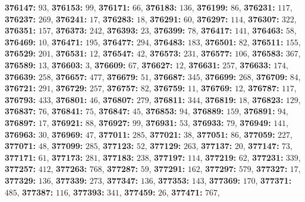 \textsf{\bfseries 376147:} $93$, \textsf{\bfseries 376153:} $99$, \textsf{\bfseries 376171:} $66$, \textsf{\bfseries 376183:} $136$, \textsf{\bfseries 376199:} $86$, \textsf{\bfseries 376231:} $117$, \textsf{\bfseries 376237:} $269$, \textsf{\bfseries 376241:} $17$, \textsf{\bfseries 376283:} $18$, \textsf{\bfseries 376291:} $60$, \textsf{\bfseries 376297:} $114$, \textsf{\bfseries 376307:} $322$, \textsf{\bfseries 376351:} $157$, \textsf{\bfseries 376373:} $242$, \textsf{\bfseries 376393:} $23$, \textsf{\bfseries 376399:} $78$, \textsf{\bfseries 376417:} $141$, \textsf{\bfseries 376463:} $58$, \textsf{\bfseries 376469:} $10$, \textsf{\bfseries 376471:} $195$, \textsf{\bfseries 376477:} $294$, \textsf{\bfseries 376483:} $183$, \textsf{\bfseries 376501:} $82$, \textsf{\bfseries 376511:} $155$, \textsf{\bfseries 376529:} $201$, \textsf{\bfseries 376531:} $12$, \textsf{\bfseries 376547:} $42$, \textsf{\bfseries 376573:} $231$, \textsf{\bfseries 376577:} $106$, \textsf{\bfseries 376583:} $367$, \textsf{\bfseries 376589:} $13$, \textsf{\bfseries 376603:} $3$, \textsf{\bfseries 376609:} $67$, \textsf{\bfseries 376627:} $12$, \textsf{\bfseries 376631:} $257$, \textsf{\bfseries 376633:} $174$, \textsf{\bfseries 376639:} $258$, \textsf{\bfseries 376657:} $477$, \textsf{\bfseries 376679:} $51$, \textsf{\bfseries 376687:} $345$, \textsf{\bfseries 376699:} $268$, \textsf{\bfseries 376709:} $84$, \textsf{\bfseries 376721:} $291$, \textsf{\bfseries 376729:} $257$, \textsf{\bfseries 376757:} $82$, \textsf{\bfseries 376759:} $11$, \textsf{\bfseries 376769:} $12$, \textsf{\bfseries 376787:} $117$, \textsf{\bfseries 376793:} $433$, \textsf{\bfseries 376801:} $46$, \textsf{\bfseries 376807:} $279$, \textsf{\bfseries 376811:} $344$, \textsf{\bfseries 376819:} $18$, \textsf{\bfseries 376823:} $129$, \textsf{\bfseries 376837:} $76$, \textsf{\bfseries 376841:} $75$, \textsf{\bfseries 376847:} $45$, \textsf{\bfseries 376853:} $94$, \textsf{\bfseries 376889:} $159$, \textsf{\bfseries 376891:} $94$, \textsf{\bfseries 376897:} $17$, \textsf{\bfseries 376921:} $88$, \textsf{\bfseries 376927:} $99$, \textsf{\bfseries 376931:} $53$, \textsf{\bfseries 376933:} $79$, \textsf{\bfseries 376949:} $141$, \textsf{\bfseries 376963:} $30$, \textsf{\bfseries 376969:} $47$, \textsf{\bfseries 377011:} $285$, \textsf{\bfseries 377021:} $38$, \textsf{\bfseries 377051:} $86$, \textsf{\bfseries 377059:} $227$, \textsf{\bfseries 377071:} $48$, \textsf{\bfseries 377099:} $285$, \textsf{\bfseries 377123:} $52$, \textsf{\bfseries 377129:} $263$, \textsf{\bfseries 377137:} $20$, \textsf{\bfseries 377147:} $73$, \textsf{\bfseries 377171:} $61$, \textsf{\bfseries 377173:} $281$, \textsf{\bfseries 377183:} $238$, \textsf{\bfseries 377197:} $114$, \textsf{\bfseries 377219:} $62$, \textsf{\bfseries 377231:} $339$, \textsf{\bfseries 377257:} $412$, \textsf{\bfseries 377263:} $768$, \textsf{\bfseries 377287:} $59$, \textsf{\bfseries 377291:} $162$, \textsf{\bfseries 377297:} $579$, \textsf{\bfseries 377327:} $17$, \textsf{\bfseries 377329:} $136$, \textsf{\bfseries 377339:} $273$, \textsf{\bfseries 377347:} $136$, \textsf{\bfseries 377353:} $143$, \textsf{\bfseries 377369:} $170$, \textsf{\bfseries 377371:} $485$, \textsf{\bfseries 377387:} $116$, \textsf{\bfseries 377393:} $341$, \textsf{\bfseries 377459:} $26$, \textsf{\bfseries 377471:} $767$, 
